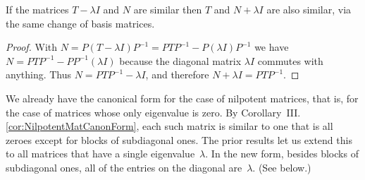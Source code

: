\begin{lemma}   \label{le:SimRespAddScalar}
If the matrices \( T-\lambda I \) and \( N \) are similar 
then \( T \) and \( N+\lambda I \) are also similar,
via the same change of basis matrices.
\end{lemma}

\begin{proof}
With \( N=P(T-\lambda I)P^{-1}=PTP^{-1}-P(\lambda I)P^{-1} \)
we have $N=PTP^{-1}-PP^{-1}(\lambda I)$
because the diagonal matrix \( \lambda I \) commutes with anything. 
Thus \( N=PTP^{-1}-\lambda I \),
and therefore \( N+\lambda I=PTP^{-1} \).
\end{proof}

We already have the canonical form for 
the case of nilpotent matrices, 
that is, for the case of matrices whose only eigenvalue is zero.
By Corollary~III.\ref{cor:NilpotentMatCanonForm}, each 
such matrix is similar to one that is all
zeroes except for blocks of subdiagonal ones.
The prior results let us extend this to all
matrices that have a single eigenvalue~$\lambda$.
In the new form,
besides blocks of subdiagonal ones, all of the entries on the diagonal 
are~$\lambda$.
(See  below.)

